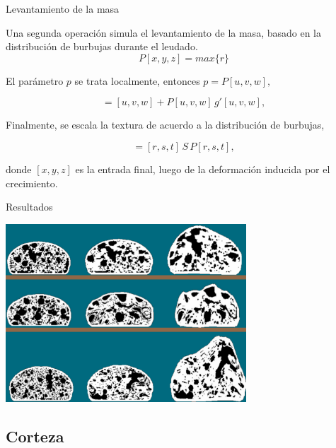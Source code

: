 \documentclass[spanish]{beamer}
\begin{document}
\begin{frame}{Levantamiento de la masa}

Una segunda operación simula el levantamiento de la masa, basado en la distribución de burbujas durante el leudado.
\begin{equation*}
P[x,y,z] = max \bigg\{r\bigg\}
\end{equation*}

El parámetro $p$ se trata localmente, entonces $p = P[u,v,w],$

\begin{equation*}
[r,s,t] = [u,v,w] + P[u,v,w] \, g'[u,v,w],
\end{equation*}



Finalmente, se escala la textura de acuerdo a la distribución de burbujas,


\begin{equation}
[x,y,z] = [r,s,t]\, S \, P[r,s,t],
\end{equation}

\noindent donde $[x,y,z]$ es la entrada final, luego de la deformación inducida por el crecimiento.

\end{frame}

\begin{frame}{Resultados}

\centerline{\includegraphics[width=9cm]{../figures/Fig9}}

\end{frame}

\subsection{Corteza}
\end{document}
